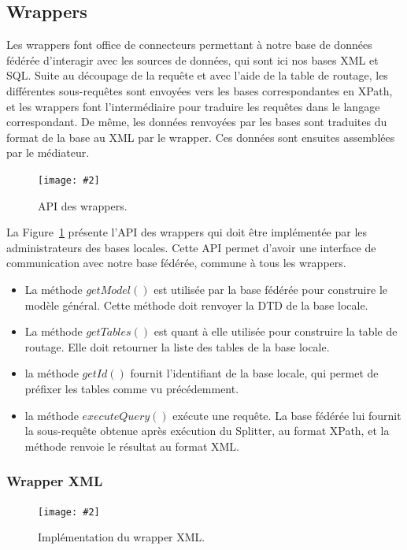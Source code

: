 \documentclass[a4paper,10pt]{article}
\newcommand{\fref}[1]{Figure~\ref{#1}}
\newcommand{\insertfigure}[4]{
\begin{figure}[ht!]
\begin{center}
\texttt{[image: \#2]}
\caption{#3}
\label{#4}
\end{center}
\end{figure}
}
\begin{document}


\subsection{Wrappers}

Les wrappers font office de connecteurs permettant à notre base de données fédérée d'interagir avec les sources de données, qui sont ici nos bases XML et SQL. Suite au découpage de la requête et avec l'aide de la table de routage, les différentes sous-requêtes sont envoyées vers les bases correspondantes en XPath, et les wrappers font l'intermédiaire pour traduire les requêtes dans le langage correspondant. De même, les données renvoyées par les bases sont traduites du format de la base au XML par le wrapper. Ces données sont  ensuites assemblées par le médiateur.


\insertfigure{0.55}{WrapperInterface.png}{API des wrappers.}{fig:wrapperInterface}

La \fref{fig:wrapperInterface} présente l'API des wrappers qui doit être implémentée par les administrateurs des bases locales. Cette API permet d'avoir une interface de communication avec notre base fédérée, commune à tous les wrappers.
\begin{itemize}
\item La méthode \(getModel()\) est utilisée par la base fédérée pour construire le modèle général. Cette méthode doit renvoyer la DTD de la base locale. 
\item La méthode \(getTables()\) est quant à elle utilisée pour construire la table de routage. Elle doit retourner la liste des tables de la base locale. 
\item la méthode \(getId()\) fournit l'identifiant de la base locale, qui permet de préfixer les tables comme vu précédemment. 
\item la méthode \(executeQuery()\) exécute une requête. La base fédérée lui fournit la sous-requête obtenue après exécution du Splitter, au format XPath, et la méthode renvoie le résultat au format XML.
\end{itemize}




\subsubsection{Wrapper XML}

\insertfigure{1}{WrapperXML.png}{Implémentation du wrapper XML.}{fig:wrapperXML}
\end{document}
